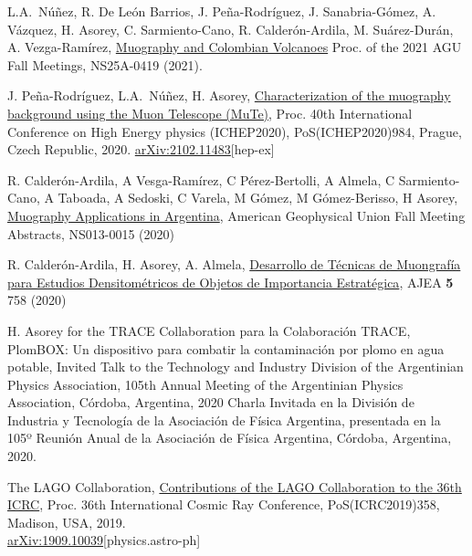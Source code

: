 \begin{etaremune}
\item {} L.A.\ Núñez, R. De León Barrios, J. Peña-Rodríguez, J. Sanabria-Gómez, A. Vázquez, H. Asorey, C. Sarmiento-Cano, R. Calderón-Ardila, M. Suárez-Durán, A. Vezga-Ramírez, \href{https://ui.adsabs.harvard.edu/abs/2021AGUFMNS25A0419N}{Muography and Colombian Volcanoes} \in Proc. of the 2021 AGU Fall Meetings, NS25A-0419 (2021).

\item {} J. Peña-Rodríguez, L.A.\ Núñez, H. Asorey, \href{https://doi.org/10.22323/1.390.0984}{Characterization of the muography background using the Muon Telescope (MuTe)}, \en Proc.
40th International Conference on High Energy physics (ICHEP2020), PoS(ICHEP2020)984, Prague,  Czech Republic, 2020. \href{http://arxiv.org/abs/2102.11483}{arXiv:2102.11483}[hep-ex]

\item {} R. Calderón-Ardila, A Vesga-Ramírez, C Pérez-Bertolli, A Almela, C Sarmiento-Cano, A Taboada, A Sedoski, C Varela, M Gómez, M Gómez-Berisso, H Asorey, \href{https://ui.adsabs.harvard.edu/abs/2020AGUFMNS0130015C/abstract}{Muography Applications in Argentina}, American Geophysical Union Fall Meeting Abstracts, NS013-0015 (2020)

\item {} R. Calderón-Ardila, H. Asorey, A. Almela, \href{https://doi.org/10.33414/ajea.5.758.2020}{Desarrollo de Técnicas de Muongrafía para Estudios Densitométricos de Objetos de Importancia Estratégica}, AJEA {\textbf{5}} 758 (2020)

\item {} H. Asorey \ifeng for the TRACE Collaboration \else para la Colaboración TRACE\fi, PlomBOX: Un dispositivo para combatir la contaminación por plomo en agua potable, \ifeng Invited Talk to the Technology and Industry Division of the Argentinian Physics Association, 105th Annual Meeting of the Argentinian Physics Association, Córdoba, Argentina, 2020 \else Charla Invitada en la División de Industria y Tecnología de la Asociación de Física Argentina, presentada en la 105º Reunión Anual de la Asociación de Física Argentina, Córdoba, Argentina, 2020.\fi

\item {} The LAGO Collaboration, \href{https://arxiv.org/abs/1909.10039}{Contributions of the LAGO Collaboration to the 36th ICRC}, \en Proc.
36th International Cosmic Ray Conference, PoS(ICRC2019)358, Madison, USA, 2019.\\ \href{http://arxiv.org/abs/1909.10039}{arXiv:1909.10039}[physics.astro-ph]


\end{etaremune}
